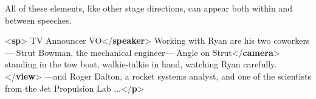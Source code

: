 All of these elements, like other stage directions, can appear both within and between speeches. \par\bgroup{}\exampleFont \begin{shaded}\noindent\mbox{}{<\textbf{sp}>}\mbox{}\newline 
{}TV Announcer VO{</\textbf{speaker}>}\mbox{}\newline 
{}Working with Ryan are his two coworkers—\mbox{}\newline 
\hspace*{1em}\hspace*{1em} Strut Bowman, the mechanical engineer—\mbox{}\newline 
{}\mbox{}\newline 
\hspace*{1em}\hspace*{1em}Angle on Strut{</\textbf{camera}>}\mbox{}\newline 
\hspace*{1em}\hspace*{1em}\hspace*{1em}\hspace*{1em} standing in the tow boat, walkie-talkie in hand,\mbox{}\newline 
\hspace*{1em}\hspace*{1em}\hspace*{1em}\hspace*{1em} watching Ryan carefully.{</\textbf{view}>}\mbox{}\newline 
\hspace*{1em}\hspace*{1em} —and Roger Dalton, a rocket\mbox{}\newline 
\hspace*{1em}\hspace*{1em} systems analyst, and one of the scientists\mbox{}\newline 
\hspace*{1em}\hspace*{1em} from the Jet Propulsion Lab ...{</\textbf{p}>}\mbox{}\newline 

\end{shaded}
